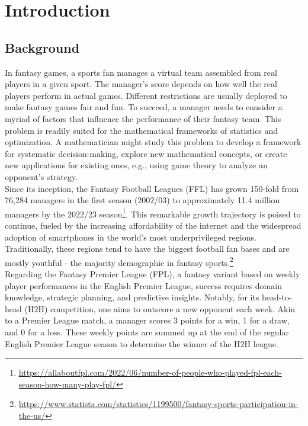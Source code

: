 \documentclass[12pt,oneside,a4paper]{book}
\theoremstyle{definition}
\theoremstyle{remark}
\begin{document}
	\newpage
	\tableofcontents

	\mainmatter
	\chapter{Introduction}
		\section{Background}
			In fantasy games, a sports fan manages a virtual team assembled from real players in a given sport. The manager’s score depends on how well the real players perform in actual games. Different restrictions are usually deployed to make fantasy games fair and fun. To succeed, a manager needs to consider a myriad of factors that influence the performance of their fantasy team. This problem is readily suited for the mathematical frameworks of statistics and optimization. A mathematician might study this problem to develop a framework for systematic decision-making, explore new mathematical concepts, or create new applications for existing ones, e.g., using game theory to analyze an opponent’s strategy.
			\\

			Since its inception, the Fantasy Football Leagues (FFL) has grown 150-fold from 76,284 managers in the first season (2002/03) to approximately 11.4 million managers by the 2022/23 season\footnote{\url{https://allaboutfpl.com/2022/06/number-of-people-who-played-fpl-each-season-how-many-play-fpl/}}. This remarkable growth trajectory is poised to continue, fueled by the increasing affordability of the internet and the widespread adoption of smartphones in the world’s most underprivileged regions. Traditionally, these regions tend to have the biggest football fan bases and are mostly youthful - the majority demographic in fantasy sports.\footnote{\url{https://www.statista.com/statistics/1199500/fantasy-sports-participation-in-the-us/}}
			\\

			Regarding the Fantasy Premier League (FPL), a fantasy variant based on weekly player performances in the English Premier League, success requires domain knowledge, strategic planning, and predictive insights. Notably, for its head-to-head (H2H) competition, one aims to outscore a new opponent each week. Akin to a Premier League match, a manager scores 3 points for a win, 1 for a draw, and 0 for a loss. These weekly points are summed up at the end of the regular English Premier League season to determine the winner of the H2H league.
\end{document}
